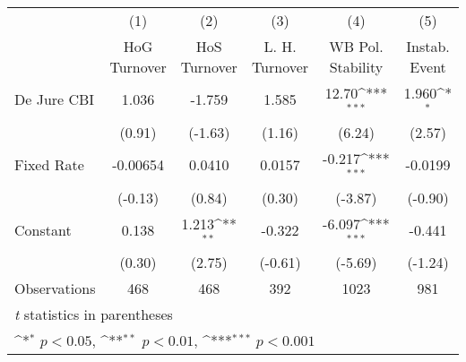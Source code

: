 \begin{table}[htbp]\centering
\def\sym#1{\ifmmode^{#1}\else\(^{#1}\)\fi}
\caption{\label{hiKfivs}}
\begin{tabular}{l*{5}{c}}
\toprule
                                        &\multicolumn{1}{c}{(1)}&\multicolumn{1}{c}{(2)}&\multicolumn{1}{c}{(3)}&\multicolumn{1}{c}{(4)}&\multicolumn{1}{c}{(5)}\\
                                        &\multicolumn{1}{c}{HoG Turnover}&\multicolumn{1}{c}{HoS Turnover}&\multicolumn{1}{c}{L. H. Turnover}&\multicolumn{1}{c}{WB Pol. Stability}&\multicolumn{1}{c}{Instab. Event}\\
\midrule
De Jure CBI                             &    1.036         &   -1.759         &    1.585         &    12.70\sym{***}&    1.960\sym{*}  \\
                                        &   (0.91)         &  (-1.63)         &   (1.16)         &   (6.24)         &   (2.57)         \\
\addlinespace
Fixed Rate                              & -0.00654         &   0.0410         &   0.0157         &   -0.217\sym{***}&  -0.0199         \\
                                        &  (-0.13)         &   (0.84)         &   (0.30)         &  (-3.87)         &  (-0.90)         \\
\addlinespace
Constant                                &    0.138         &    1.213\sym{**} &   -0.322         &   -6.097\sym{***}&   -0.441         \\
                                        &   (0.30)         &   (2.75)         &  (-0.61)         &  (-5.69)         &  (-1.24)         \\
\midrule
Observations                            &      468         &      468         &      392         &     1023         &      981         \\
\bottomrule
\multicolumn{6}{l}{\footnotesize \textit{t} statistics in parentheses}\\
\multicolumn{6}{l}{\footnotesize \sym{*} \(p<0.05\), \sym{**} \(p<0.01\), \sym{***} \(p<0.001\)}\\
\end{tabular}
\end{table}
